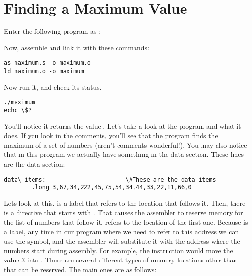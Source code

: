 \section{Finding a Maximum Value}
\label{maximum}

Enter the following program as :

\begin{simpletyping}

\end{simpletyping}

Now, assemble and link it with these commands:

\begin{simpletyping}
\begin{lstlisting}
as maximum.s -o maximum.o
ld maximum.o -o maximum
\end{lstlisting}
\end{simpletyping}

Now run it, and check its status.

\begin{simpletyping}
\begin{lstlisting}
./maximum
echo \$?
\end{lstlisting}
\end{simpletyping}

You'll notice it returns the value .  Let's take
a look at the program and what it does.  If you look in the comments, you'll
see that the program finds the maximum of a set of numbers (aren't comments
wonderful!).  You may also notice that in this program we actually have 
something in the data section.  
These lines are the data section:

\begin{simpletyping}
\begin{lstlisting}
data\_items:                       \#These are the data items
        .long 3,67,34,222,45,75,54,34,44,33,22,11,66,0
\end{lstlisting}
\end{simpletyping}

Lets look at this.   is a 
label that
refers to the location that follows it.  Then, there is a directive
that starts with .  That causes the assembler
to reserve memory for the list of numbers that follow it.  
 refers to the location of the first one.  
Because  is a label, any time in our program
where we need to refer to this address we can use the 
 symbol, and the assembler will substitute
it with the address where the numbers start during assembly.  For example,
the instruction  would move the
value 3 into {\eaxReg}.
There are several different types of memory locations other than 
that can be reserved.  The main ones are as follows:

